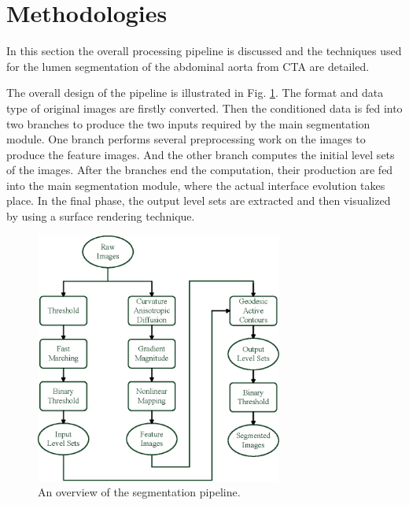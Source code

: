 
\section{Methodologies}
\label{sec3_2}

In this section the overall processing pipeline is discussed and the techniques used for the lumen segmentation of the abdominal aorta from CTA are detailed.

The overall design of the pipeline is illustrated in Fig. \ref{fig:DataFlow3}.
The format and data type of original images are firstly converted.
Then the conditioned data is fed into two branches to produce the two inputs required by the main segmentation module.
One branch performs several preprocessing work on the images to produce the feature images. %
And the other branch computes the initial level sets of the images. %
After the branches end the computation, their production are fed into the main segmentation module, where the actual interface evolution takes place.
In the final phase, the output level sets are extracted and then visualized by using a surface rendering technique.
\begin{figure}[t]
\centering
\includegraphics[width=3.2in]{figures/chap03/DataFlow.eps}
\caption{An overview of the segmentation pipeline.}
\label{fig:DataFlow3}
\end{figure}

